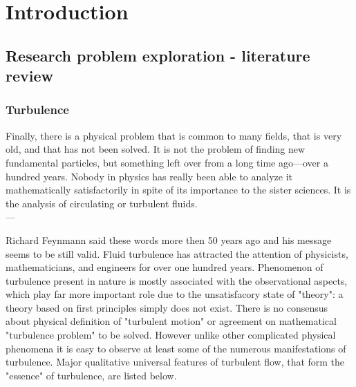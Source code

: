 \documentclass[../main.tex]{subfiles}
\begin{document}
\chapter{Introduction} %

\label{ch:intro} %

\section{Research problem exploration - literature review}

\subsection{Turbulence}
\begin{flushright}{\slshape}    
Finally, there is a physical problem that is common to many fields, that is very old, and that has not been solved. It is not the problem of finding new fundamental particles, but something left over from a long time ago—over a hundred years. Nobody in physics has really been able to analyze it mathematically satisfactorily in spite of its importance to the sister sciences. It is the analysis of circulating or turbulent fluids. \\ \medskip
--- \citep{Feynmann_I}
\end{flushright}

 Richard Feynmann said these words  more then 50 years ago  and his message seems to be still valid. Fluid turbulence has attracted the attention of physicists, mathematicians, and engineers for over one hundred years. Phenomenon of turbulence present in nature is mostly associated with the observational aspects, which play far more important role due to the unsatisfacory state of "theory": a theory based on first principles simply does not exist. There is no consensus about physical definition of "turbulent motion" or agreement on mathematical "turbulence problem" to be solved. However unlike other complicated physical phenomena it is easy to observe at least some of the numerous manifestations of turbulence. Major qualitative universal features of turbulent flow, that form the "essence" of turbulence, are listed below.
\end{document}

